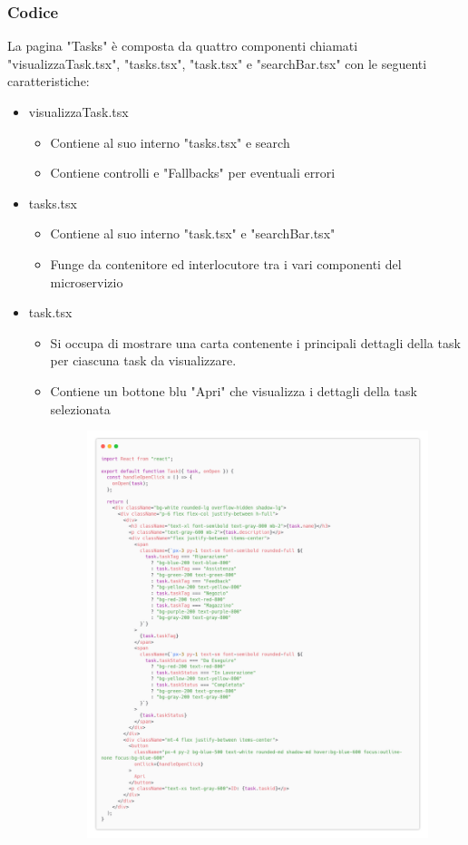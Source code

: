 \documentclass{report}
\begin{document}
\subsubsection*{Codice}
La pagina "Tasks" è composta da quattro componenti chiamati "visualizzaTask.tsx", "tasks.tsx", "task.tsx" e "searchBar.tsx" con le seguenti caratteristiche:
\begin{itemize}
	\item visualizzaTask.tsx
	\begin{itemize}
		\item Contiene al suo interno "tasks.tsx" e search
		\item Contiene controlli e "Fallbacks" per eventuali errori
	\end{itemize}
		\item tasks.tsx
	\begin{itemize}
		\item Contiene al suo interno "task.tsx" e "searchBar.tsx"
		\item Funge da contenitore ed interlocutore tra i vari componenti del microservizio
	\end{itemize}
	\item task.tsx
	\begin{itemize}
		\item Si occupa di mostrare una carta contenente i principali dettagli della task per ciascuna task da visualizzare.
		\item Contiene un bottone blu "Apri" che visualizza i dettagli della task selezionata
		\begin{figure}[H]
			\centering\includegraphics[width=1\textwidth]{images/microservizio-task/frontend/task-carbon.png}

\end{figure}
\end{itemize}
\end{itemize}
\end{document}
